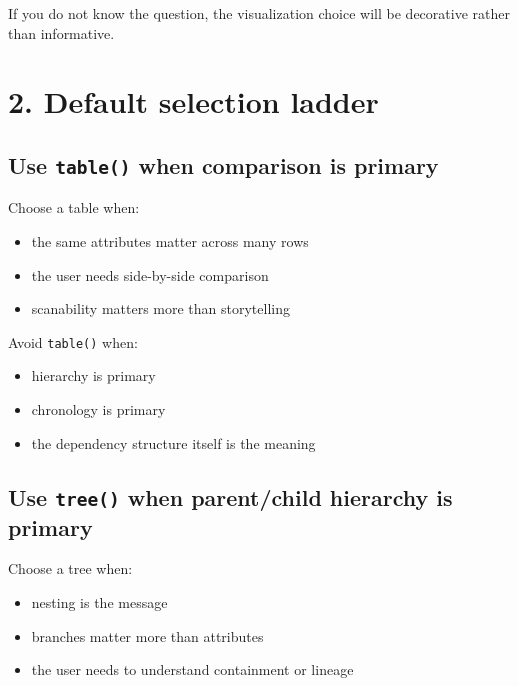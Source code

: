 If you do not know the question, the visualization choice will be decorative rather than informative.

\section{2. Default selection ladder}\label{record-020-default-selection-ladder}

\subsection{\texorpdfstring{Use \texttt{t\allowbreak{}a\allowbreak{}b\allowbreak{}l\allowbreak{}e\allowbreak{}(\allowbreak{})} when comparison is primary}{Use  when comparison is primary}}\label{record-020-use-table-when-comparison-is-primary}

Choose a table when:

\begin{itemize}
\tightlist
\item
  the same attributes matter across many rows
\item
  the user needs side-by-side comparison
\item
  scanability matters more than storytelling
\end{itemize}

Avoid \texttt{t\allowbreak{}a\allowbreak{}b\allowbreak{}l\allowbreak{}e\allowbreak{}(\allowbreak{})} when:

\begin{itemize}
\tightlist
\item
  hierarchy is primary
\item
  chronology is primary
\item
  the dependency structure itself is the meaning
\end{itemize}

\subsection{\texorpdfstring{Use \texttt{t\allowbreak{}r\allowbreak{}e\allowbreak{}e\allowbreak{}(\allowbreak{})} when parent/child hierarchy is primary}{Use  when parent/child hierarchy is primary}}\label{record-020-use-tree-when-parentchild-hierarchy-is-primary}

Choose a tree when:

\begin{itemize}
\tightlist
\item
  nesting is the message
\item
  branches matter more than attributes
\item
  the user needs to understand containment or lineage
\end{itemize}

